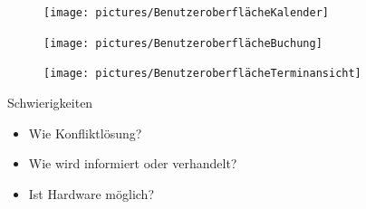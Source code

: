 \begin{frame}
    \begin{figure}
        \centering
        \texttt{[image: pictures/BenutzeroberflächeKalender]}
        \label{fig: Mockup Übersicht}
    \end{figure}
\end{frame}

\begin{frame}
    \begin{figure}
        \centering
        \texttt{[image: pictures/BenutzeroberflächeBuchung]}
        \label{fig: Mockup Termin Buchen}
    \end{figure}
\end{frame}

\begin{frame}
    \begin{figure}
        \centering
        \texttt{[image: pictures/BenutzeroberflächeTerminansicht]}
        \label{fig: Mockup Terminansicht}
    \end{figure}
\end{frame}

\begin{frame}{Schwierigkeiten}
    \begin{itemize}
        \item Wie Konfliktlösung?
        \item Wie wird informiert oder verhandelt?
        \item Ist Hardware möglich?
    \end{itemize}
\end{frame}
